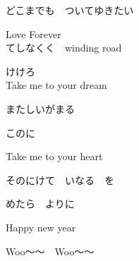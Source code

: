 {どこまでも　ついてゆきたい

Love Forever
\\

てしなくく　winding road

けけろ
\\

Take me to your dream

またしいがまる

このに

Take me to your heart

そのにけて　いなる　を

めたら　よりに

Happy new year

Woo～～　Woo～～

}